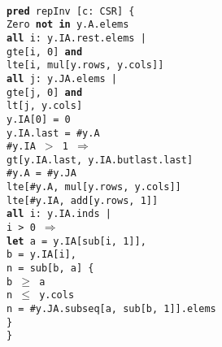 \documentclass[11pt,conference]{IEEEtran}
\newenvironment{myquote}{\list{}{\leftmargin=12pt\rightmargin=0pt}\item[]}{\endlist}
\def\TA{\makebox[12pt]{}}
\def\TB{\makebox[24pt]{}}
\def\TC{\makebox[36pt]{}}
\def\TD{\makebox[48pt]{}}
\def\Bpred{\textbf{pred} }
\def\Ball{\textbf{all} }
\def\Bin{\textbf{in} }
\def\Band{\textbf{and} }
\def\Bnot{\textbf{not} }
\def\Bimplies{$\Rightarrow$ }
\def\Blet{\textbf{let} }
\begin{document}
\begin{figure}
\centering
\begin{myquote}\small{\texttt{\\
\Bpred repInv [c: CSR] \{\\
\TA Zero \Bnot \Bin y.A.elems\\
\TA \Ball i: y.IA.rest.elems |\\
\TB gte[i, 0] \Band\\
\TB lte[i, mul[y.rows, y.cols]]\\
\TA \Ball j: y.JA.elems |\\
\TB gte[j, 0] \Band\\
\TB lt[j, y.cols]\\
\TA y.IA[0] = 0\\
\TA y.IA.last = \#y.A\\
\TA \#y.IA $>$ 1 \Bimplies\\
\TC gt[y.IA.last, y.IA.butlast.last]\\
\TA \#y.A = \#y.JA\\
\TA lte[\#y.A, mul[y.rows, y.cols]]\\
\TA lte[\#y.IA, add[y.rows, 1]]\\
\TA \Ball i: y.IA.inds |\\
\TB i > 0 \Bimplies\\
\TC \Blet a = y.IA[sub[i, 1]],\\
\TC       b = y.IA[i],\\
\TC       n = sub[b, a] \{\\
\TD   b $\geq$ a\\
\TD   n $\leq$ y.cols\\
\TD   n = \#y.JA.subseq[a, sub[b, 1]].elems\\
\TC \}\\
\}
}}
\end{myquote}
\end{figure}

\end{document}
